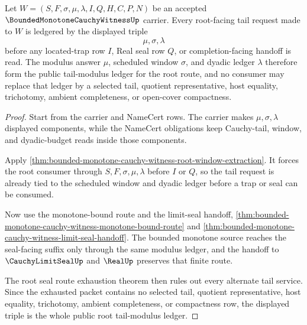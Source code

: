 \begin{theorem}\label{thm:bounded-monotone-cauchy-witness-root-tail-modulus-ledger}
Let $W=(S,F,\sigma,\mu,\lambda,I,Q,H,C,P,N)$ be an accepted $\BoundedMonotoneCauchyWitnessUp$ carrier. Every root-facing tail request made to $W$ is ledgered by the displayed triple
$$
\mu,\sigma,\lambda
$$
before any located-trap row $I$, Real seal row $Q$, or completion-facing handoff is read. The modulus answer $\mu$, scheduled window $\sigma$, and dyadic ledger $\lambda$ therefore form the public tail-modulus ledger for the root route, and no consumer may replace that ledger by a selected tail, quotient representative, host equality, trichotomy, ambient completeness, or open-cover compactness.
\end{theorem}
\begin{proof}
Start from the carrier and NameCert rows. The carrier makes $\mu,\sigma,\lambda$ displayed components, while the NameCert obligations keep Cauchy-tail, window, and dyadic-budget reads inside those components.

Apply \autoref{thm:bounded-monotone-cauchy-witness-root-window-extraction}. It forces the root consumer through $S,F,\sigma,\mu,\lambda$ before $I$ or $Q$, so the tail request is already tied to the scheduled window and dyadic ledger before a trap or seal can be consumed.

Now use the monotone-bound route and the limit-seal handoff, \autoref{thm:bounded-monotone-cauchy-witness-monotone-bound-route} and \autoref{thm:bounded-monotone-cauchy-witness-limit-seal-handoff}. The bounded monotone source reaches the seal-facing suffix only through the same modulus ledger, and the handoff to $\CauchyLimitSealUp$ and $\RealUp$ preserves that finite route.

The root seal route exhaustion theorem then rules out every alternate tail service. Since the exhausted packet contains no selected tail, quotient representative, host equality, trichotomy, ambient completeness, or compactness row, the displayed triple is the whole public root tail-modulus ledger.
\end{proof}

